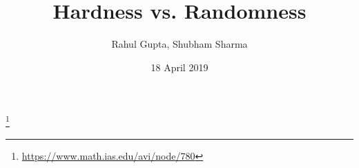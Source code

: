 \documentclass[xcolor={table,dvipsnames,usenames}]{beamer}
\title{Hardness vs. Randomness}
\author{Rahul Gupta\inst{1}, 
	Shubham Sharma\inst{1}}
\institute[Universities of Somewhere and Elsewhere] %
{
  \inst{1}%
  Indian Institute of Technology Kanpur, India}
\date{18 April 2019}
\begin{document}
\newcommand{\ddnnf}{\ensuremath{\mathsf{dag}}}
\newcommand{\Poly}{\ensuremath{\mathsf{P}}}
\newcommand{\NP}{\ensuremath{\mathsf{NP}}}
\newcommand{\WAPS}{\ensuremath{\mathsf{WAPS}}}
\newcommand{\KUS}{\ensuremath{\mathsf{KUS}}}
\newcommand{\DSPACE}{\ensuremath{\mathsf{DSPACE}}}
\newcommand{\EXPTIME}{\ensuremath{\mathsf{EXPTIME}}}
\newcommand{\RNC}{\ensuremath{\mathsf{RNC}}}
\newcommand{\BPP}{\ensuremath{\mathsf{BPP}}}
\newcommand{\DTIME}{\ensuremath{\mathsf{DTIME}}}
\newcommand{\RTIME}{\ensuremath{\mathsf{RTIME}}}
\newcommand{\WeightGen}{\ensuremath{\mathsf{WeightGen}}}
\newcommand{\prob}{\ensuremath{\mathsf{Pr}}}
\newcommand{\UniGen}{\ensuremath{\mathsf{UniGen2}}}
\newcommand{\satisfying}[1]{\ensuremath{R_{#1}}} %
\newcommand{\satisfyingv}[2]{\ensuremath{R_{#1\downarrow #2}}}
\newcommand{\Sampler}{\ensuremath{\mathsf{Sampler}}}
\newcommand{\sampleList}{\ensuremath{\mathsf{SampleList}}}
\newcommand{\Shuffle}{\ensuremath{\mathsf{Shuffle}}}
\newcommand{\Append}{\ensuremath{\mathsf{Append}}}
\newcommand{\Stitch}{\ensuremath{\mathsf{Stitch}}}
\newcommand{\IS}{\ensuremath{\mathsf{IS}}}
\newcommand{\normalize}{\ensuremath{\mathsf{Normalize}}}
\newcommand{\WCounter}{\ensuremath{\mathsf{WAnnotate}}}
\newcommand{\PCompile}{\ensuremath{\mathsf{PCompile}}}


\begin{frame}
  \titlepage
  \begin{center}
  	\footnote{\href{https://www.math.ias.edu/avi/node/780}{https://www.math.ias.edu/avi/node/780}}
  \end{center}
  
\end{frame}
\end{document}
